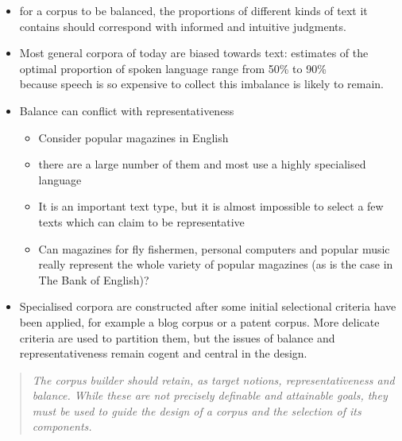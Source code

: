 \documentclass[a4paper,landscape,headrule,footrule,xetex]{foils}
\begin{document}
\begin{itemize}
\item for a corpus to be  balanced, the proportions of different kinds of text it contains should correspond with informed and intuitive judgments.
\item Most general corpora of today are biased towards text: estimates of the optimal proportion of spoken language range from 50\% to 90\%
\\ because speech  is so expensive to collect this imbalance is likely to remain.
\item Balance can conflict with representativeness
  \begin{itemize}
  \item Consider popular magazines in English
  \item  there are a large number of them and most use a highly specialised language
  \item It is an important text type, but it is almost impossible to select a few texts which can claim to be representative
  \item Can magazines for fly fishermen, personal computers and popular music really represent the whole variety of popular magazines (as is the case in The Bank of English)?
  \end{itemize}
\item Specialised corpora are constructed after some initial
  selectional criteria have been applied, for example a blog corpus or
  a patent corpus. More delicate criteria are used to partition them,
  but the issues of balance and representativeness remain cogent and
  central in the design.
\end{itemize}

\begin{quotation}
  \textit{The corpus builder should retain, as target notions,
    representativeness and balance. While these are not precisely
    definable and attainable goals, they must be used to guide the
    design of a corpus and the selection of its components.}
\end{quotation}


\end{document}
